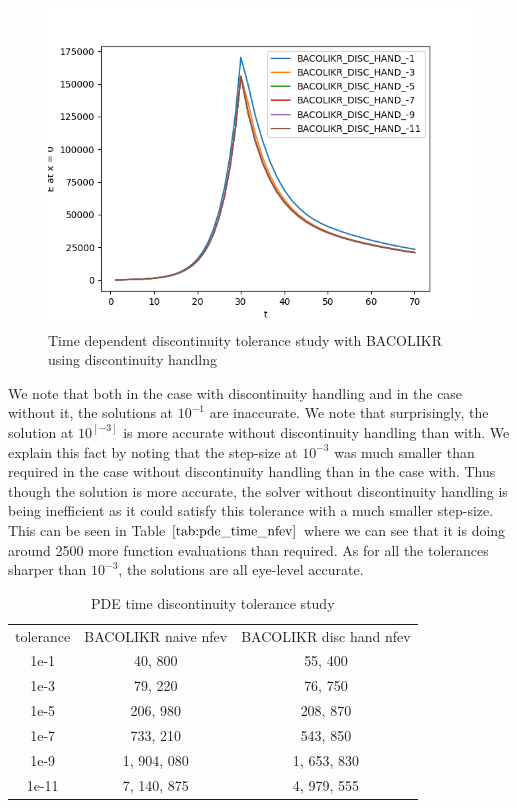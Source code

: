 \documentclass{article}
\begin{document}
\begin{figure}[H]
\centering
\includegraphics[width=0.7\linewidth]{./figures/pde_time_disc_bacolikr_disc_hand_tol}
\caption{Time dependent discontinuity tolerance study with BACOLIKR using discontinuity handlng}
\label{fig:pde_time_disc_bacolikr_disc_hand_tol}
\end{figure}

We note that both in the case with discontinuity handling and in the case without it, the solutions at $10^{-1}$ are inaccurate. We note that surprisingly, the solution at $10^[-3]$ is more accurate without discontinuity handling than with. We explain this fact by noting that the step-size at $10^{-3}$ was much smaller than required in the case without discontinuity handling than in the case with. Thus though the solution is more accurate, the solver without discontinuity handling is being inefficient as it could satisfy this tolerance with a much smaller step-size. This can be seen in Table $\ref{tab:pde_time_nfev}$ where we can see that it is doing around 2500 more function evaluations than required. As for all the tolerances sharper than $10^{-3}$, the solutions are all eye-level accurate.

\begin{table}[h]
\caption {PDE time discontinuity tolerance study} 
\label{tab:pde_time_nfev}
\begin{center}
\begin{tabular}{ c c c } 
tolerance & BACOLIKR naive nfev & BACOLIKR disc hand nfev \\ 
1e-1      &     40, 800         &     55, 400 \\
1e-3      &     79, 220         &     76, 750 \\
1e-5      &    206, 980         &    208, 870 \\
1e-7      &    733, 210         &    543, 850 \\
1e-9      & 1, 904, 080         & 1, 653, 830 \\
1e-11     & 7, 140, 875         & 4, 979, 555 \\
\end{tabular}
\end{center}
\end{table}
\end{document}
